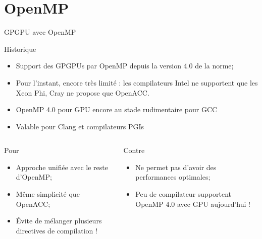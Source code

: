 \documentclass[handout,francais]{beamer}
\begin{document}
\section{OpenMP}

\begin{frame}[fragile]{GPGPU avec OpenMP}
\scriptsize
\begin{block}{Historique}
\begin{itemize}
\item Support des GPGPUs par OpenMP depuis la version 4.0 de la norme;
\item Pour l'instant, encore très limité : les compilateurs Intel ne
supportent que les Xeon Phi, Cray ne propose que OpenACC.
\item OpenMP 4.0 pour GPU encore au stade rudimentaire pour GCC
\item Valable pour Clang et compilateurs PGIs
\end{itemize}
\end{block}

\begin{columns}
\begin{column}{0.5\textwidth}
\begin{exampleblock}{Pour}
\begin{itemize}
\item Approche unifiée avec le reste d'OpenMP;
\item Même simplicité que OpenACC;
\item \'Evite de mélanger plusieurs directives de compilation !
\end{itemize}
\end{exampleblock}
\end{column}
\begin{column}{0.5\textwidth}
\begin{alertblock}{Contre}
\begin{itemize}
\item Ne permet pas d'avoir des performances optimales;
\item Peu de compilateur supportent OpenMP 4.0 avec GPU aujourd'hui !
\end{itemize}
\end{alertblock}
\end{column}
\end{columns}
\end{frame}
\end{document}
